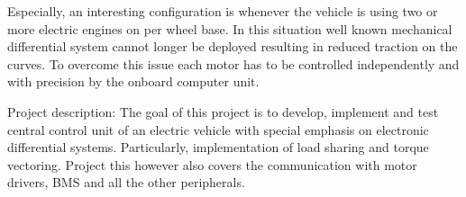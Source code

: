 Especially, an interesting configuration is whenever the vehicle is using two or more electric engines on per wheel base. In this situation well known mechanical differential system cannot longer be deployed resulting in reduced traction on the curves. To overcome this issue each motor has to be controlled independently and with precision by the onboard computer unit.

Project description: 	
The goal of this project is to develop, implement and test central control unit of an electric vehicle with special emphasis on electronic differential systems. Particularly, implementation of load sharing and torque vectoring. Project this however also covers the communication with motor drivers, BMS and all the other peripherals.

